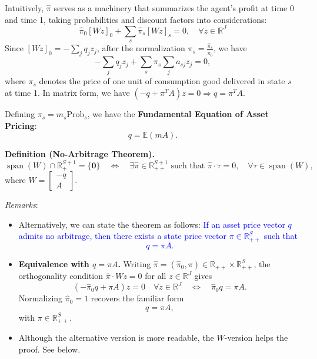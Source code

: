 Intuitively, $\hat{\pi}$ serves as a machinery that summarizes the agent's profit at time 0 and time 1, 
taking probabilities and discount factors into considerations:
\[
\hat{\pi}_0 [Wz]_{0} + \sum_s \hat{\pi}_s  [Wz]_{s} = 0, \quad \forall z \in \mathbb{R}^{J}
\]
Since $[Wz]_{0} = - \sum_j q_j z_j $, after the normalization $\pi_s = \frac{\hat{\pi}_s}{\hat{\pi}_0}$, we have 
\[
- \sum_j q_j z_j  +  \sum_s \pi_s \sum_j a_{sj} z_j = 0,
\]
where $\pi_s$ denotes the price of one unit of consumption good delivered in state $s$ at time 1.
In matrix form, we have $(-q + \pi^{T} A) z = 0 \Rightarrow q = \pi^{T} A$.
\begin{tcolorbox}
Defining $\pi_s = m_s \text{Prob}_s$, we have the \textbf{Fundamental Equation of Asset Pricing}:
\begin{equation}
    \label{eqn:fundamental_asset_pricing_eqn}
    q = \mathbb{E}\left(m A \right).
\end{equation}
\end{tcolorbox}

\clearpage
\begin{tcolorbox}
\textbf{Definition (No-Arbitrage Theorem).}
\[
\operatorname{span}(W) \cap \mathbb{R}^{S+1}_{+} = \{ \bm{0}\}
\quad \Longleftrightarrow \quad
\exists \hat{\pi} \in \mathbb{R}^{S+1}_{++}
\text{ such that }
\hat{\pi}\cdot \tau = 0,
\quad \forall \tau \in \operatorname{span}(W),
\]
where $W = \begin{bmatrix} -q \\ A \end{bmatrix}.$

\medskip

\textit{Remarks}:
\begin{itemize}
  \item Alternatively, we can state the theorem as follows:
  \textcolor{blue}{
  If an asset price vector $q$ admits no arbitrage, then there exists a state price vector
  $\pi \in \mathbb{R}^{S}_{++}$ such that
  \[
  q = \pi A.
  \]
  }

  \item \textbf{Equivalence with $q = \pi A$.}
  Writing $\hat{\pi} = (\hat{\pi}_0,\pi) \in \mathbb{R}_{++} \times \mathbb{R}_{++}^S$,
  the orthogonality condition $\hat{\pi}\cdot Wz = 0$ for all $z \in \mathbb{R}^J$ gives
  \[
  (-\hat{\pi}_0 q + \pi A)z = 0
  \quad \forall z \in \mathbb{R}^J
  \quad \Longleftrightarrow \quad
  \hat{\pi}_0 q = \pi A.
  \]
  Normalizing $\hat{\pi}_0 = 1$ recovers the familiar form
  \[
  q = \pi A,
  \]
  with $\pi \in \mathbb{R}_{++}^S$.

  \item Although the alternative version is more readable, the $W$-version helps the proof. See below.
\end{itemize}
\end{tcolorbox}

